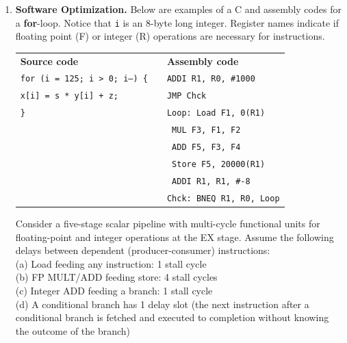\documentclass[a4paper, 11pt]{exam}
\begin{document}
\begin{center}
\begin{enumerate}

\item \textbf {Software Optimization.}
Below are examples of a C and assembly codes for a \textbf{for}-loop.
Notice that \texttt{i} is an 8-byte long integer. Register names indicate if floating point (F) or integer (R) operations are necessary for instructions.

\begin{tabular}{lll}
	\textbf{Source code} & & \textbf{Assembly code }\\
	\texttt{for (i = 125; i > 0; i--) \{}&  &\hspace{40pt}\texttt{ADDI R1, R0, \#1000} \\
	\hspace{20pt}\texttt{x[i] = s * y[i] + z;} &  &\hspace{40pt}\texttt{JMP Chck}\\
	\texttt{\}} &  &\texttt{Loop: Load F1, 0(R1)} \\
    &  &\hspace{35pt}\texttt{ MUL F3, F1, F2}\\
	&  &\hspace{35pt}\texttt{ ADD F5, F3, F4}\\
	&  &\hspace{35pt}\texttt{ Store F5, 20000(R1)}\\
	&  &\hspace{35pt}\texttt{ ADDI R1, R1, \#-8}\\
	&  &\texttt{Chck: BNEQ R1, R0, Loop}\\
\end{tabular}

Consider a five-stage scalar pipeline with multi-cycle functional units for floating-point and integer operations at the EX stage.
Assume the following delays between dependent (producer-consumer) instructions:\\
(a) Load feeding any instruction: 1 stall cycle\\
(b) FP MULT/ADD feeding store: 4 stall cycles\\
(c) Integer ADD feeding a branch: 1 stall cycle\\
(d) A conditional branch has 1 delay slot (the next instruction after a conditional branch is fetched and executed to completion without knowing the outcome of the branch)


\end{enumerate}
\end{center}
\end{document}
